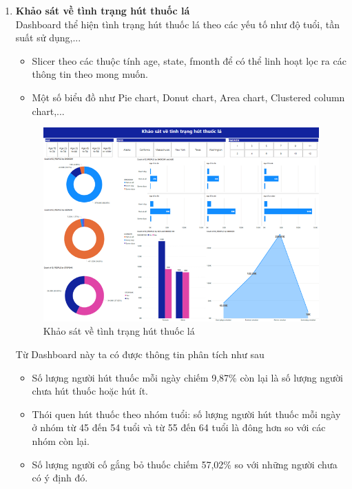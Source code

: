 \begin{enumerate}
    \item \textbf{Khảo sát về tình trạng hút thuốc lá}\\
    Dashboard thể hiện tình trạng hút thuốc lá theo các yếu tố như độ tuổi, tần suất sử dụng,...  
    \begin{itemize}[label=$-$]
        \item Slicer theo các thuộc tính age, state, fmonth để có thể linh hoạt lọc ra các thông tin theo mong muốn.
        \item Một số biểu đồ như Pie chart, Donut chart, Area chart, Clustered column chart,...
    \end{itemize}
    \begin{center}
            \begin{figure}[!h]
                \centering
                \includegraphics[scale = 0.8]{trang/dashboard3.png}
              \caption{Khảo sát về tình trạng hút thuốc lá}
            \end{figure}
    \end{center}
    Từ Dashboard này ta có được thông tin phân tích như sau
    \begin{itemize}[label= $-$]
        \item Số lượng người hút thuốc mỗi ngày chiếm 9,87\% còn lại là số lượng người chưa hút thuốc hoặc hút ít.
        
        \item Thói quen hút thuốc theo nhóm tuổi: số lượng người hút thuốc mỗi ngày ở nhóm từ 45 đến 54 tuổi và từ 55 đến 64 tuổi là đông hơn so với các nhóm còn lại.
        
        \item Số lượng người cố gắng bỏ thuốc chiếm 57,02\% so với những người chưa có ý định đó.
        

\end{itemize}
\end{enumerate}
